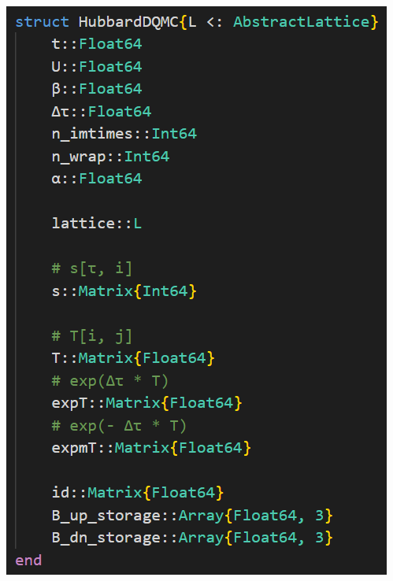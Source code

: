 \documentclass[UTF8]{ctexbeamer}
\begin{document}
\begin{frame}
\begin{columns}
\begin{column}{0.42\textwidth}
    \includegraphics[width=\textwidth]{hubbard-struct.PNG}
\end{column}

\end{columns}    

\end{frame}
\end{document}
